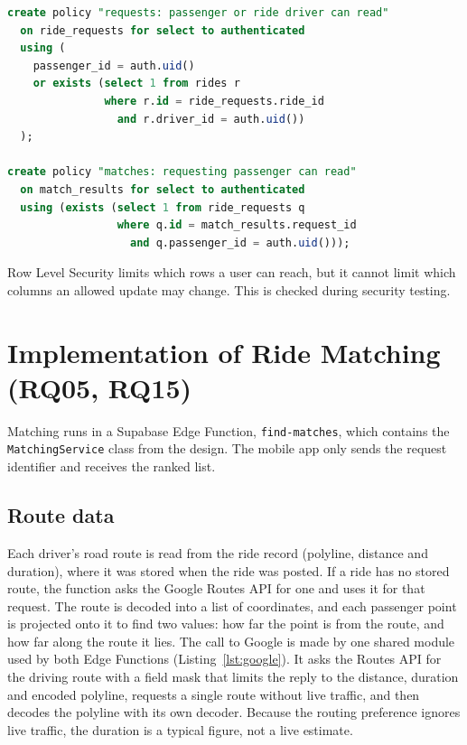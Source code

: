 \begin{lstlisting}[language=SQL,caption={Row Level Security policies for requests and match results},label={lst:rls}]
create policy "requests: passenger or ride driver can read"
  on ride_requests for select to authenticated
  using (
    passenger_id = auth.uid()
    or exists (select 1 from rides r
               where r.id = ride_requests.ride_id
                 and r.driver_id = auth.uid())
  );
 
create policy "matches: requesting passenger can read"
  on match_results for select to authenticated
  using (exists (select 1 from ride_requests q
                 where q.id = match_results.request_id
                   and q.passenger_id = auth.uid()));
\end{lstlisting}
 
Row Level Security limits which rows a user can reach, but it cannot limit which columns an allowed update may change. This is checked during security testing.
 
\section{Implementation of Ride Matching (RQ05, RQ15)}
 
Matching runs in a Supabase Edge Function, \texttt{find-matches}, which contains the \texttt{MatchingService} class from the design. The mobile app only sends the request identifier and receives the ranked list.
 
\subsection{Route data}
 
Each driver's road route is read from the ride record (polyline, distance and duration), where it was stored when the ride was posted. If a ride has no stored route, the function asks the Google Routes API for one and uses it for that request. The route is decoded into a list of coordinates, and each passenger point is projected onto it to find two values: how far the point is from the route, and how far along the route it lies. The call to Google is made by one shared module used by both Edge Functions (Listing~\ref{lst:google}). It asks the Routes API for the driving route with a field mask that limits the reply to the distance, duration and encoded polyline, requests a single route without live traffic, and then decodes the polyline with its own decoder. Because the routing preference ignores live traffic, the duration is a typical figure, not a live estimate.
 
